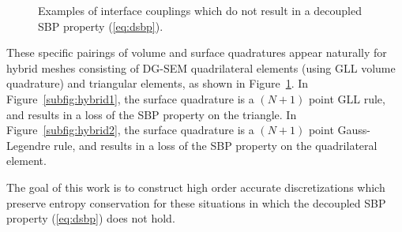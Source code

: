 \documentclass[review]{siamart0216}
\theoremstyle{assumption}
\begin{document}
\begin{figure}
\centering
\begingroup
\captionsetup[subfigure]{width=.425\textwidth}
\endgroup
\hspace{2em}
\caption{Examples of interface couplings which do not result in a decoupled SBP property (\ref{eq:dsbp}).  }
\label{fig:hybrid}
\end{figure}

These specific pairings of volume and surface quadratures appear naturally for hybrid meshes consisting of DG-SEM quadrilateral elements (using GLL volume quadrature) and triangular elements, as shown in Figure~\ref{fig:hybrid}.  In Figure~\ref{subfig:hybrid1}, the surface quadrature is a $(N+1)$ point GLL rule, and results in a loss of the SBP property on the triangle.  In Figure~\ref{subfig:hybrid2}, the surface quadrature is a $(N+1)$ point Gauss-Legendre rule, and results in a loss of the SBP property on the quadrilateral element.  

The goal of this work is to construct high order accurate discretizations which preserve entropy conservation for these situations in which the decoupled SBP property (\ref{eq:dsbp}) does not hold.  
\end{document}
